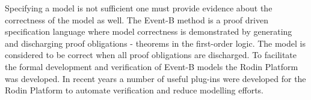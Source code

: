 Specifying a model is not sufficient one must provide evidence about the correctness of the model as well. The Event-B
method is a proof driven specification language where model  correctness is demonstrated by generating and discharging
proof obligations - theorems in the first-order logic. The model is considered to be correct when all proof obligations
are discharged. To facilitate the formal development and verification of Event-B models the Rodin Platform \cite{RodinPlatform} was developed. In recent years a number of
useful plug-ins were developed for the Rodin Platform to automate verification and reduce modelling efforts.








